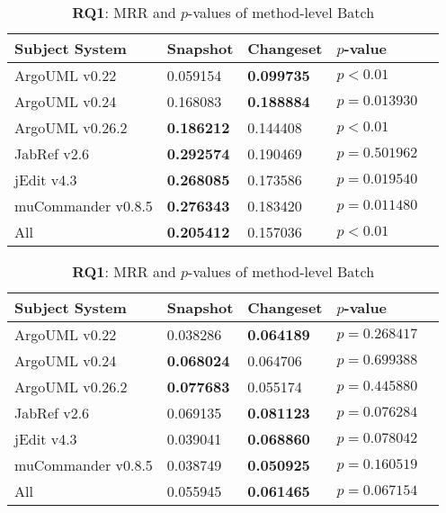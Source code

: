 \begin{table}[t]
\vspace{2mm}
\renewcommand{\arraystretch}{1.3}
\centering
\caption{{\bf RQ1}: MRR and $p$-values of class-level Batch}
\begin{tabular}{l|ll|ll}
\toprule
Subject System     & Snapshot        & Changeset       & $p$-value  \\
\midrule
ArgoUML v0.22      & 0.059154        & {\bf 0.099735 } & $p < 0.01$ \\
ArgoUML v0.24      & 0.168083        & {\bf 0.188884 } & $p = 0.013930$ \\
ArgoUML v0.26.2    & {\bf 0.186212 } & 0.144408        & $p < 0.01$ \\
JabRef v2.6        & {\bf 0.292574 } & 0.190469        & $p = 0.501962$ \\
jEdit v4.3         & {\bf 0.268085 } & 0.173586        & $p = 0.019540$ \\
muCommander v0.8.5 & {\bf 0.276343 } & 0.183420        & $p = 0.011480$ \\
\midrule
All                & {\bf 0.205412 } & 0.157036        & $p < 0.01$ \\
\bottomrule
\end{tabular}
\vspace{3mm}
\label{table:rq1:class:lda}
\caption{{\bf RQ1}: MRR and $p$-values of method-level Batch}
\begin{tabular}{l|ll|ll}
\toprule
Subject System     & Snapshot        & Changeset       & $p$-value  \\
\midrule
ArgoUML v0.22      & 0.038286        & {\bf 0.064189 } & $p = 0.268417$ \\
ArgoUML v0.24      & {\bf 0.068024 } & 0.064706        & $p = 0.699388$ \\
ArgoUML v0.26.2    & {\bf 0.077683 } & 0.055174        & $p = 0.445880$ \\
JabRef v2.6        & 0.069135        & {\bf 0.081123 } & $p = 0.076284$ \\
jEdit v4.3         & 0.039041        & {\bf 0.068860 } & $p = 0.078042$ \\
muCommander v0.8.5 & 0.038749        & {\bf 0.050925 } & $p = 0.160519$ \\
\midrule
All                & 0.055945        & {\bf 0.061465 } & $p = 0.067154$ \\
\bottomrule
\end{tabular}
\label{table:rq1:method:lda}
\end{table}
